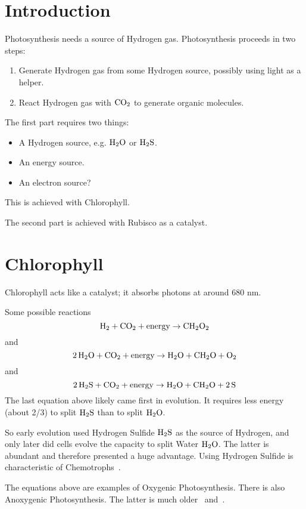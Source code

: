 \documentclass[a4paper,14pt]{extarticle}
\def\H{{\rm H}}
\def\O{{\rm O}}
\def\C{{\rm C}}
\def\S{{\rm S}}
\begin{document}

\section{Introduction}

Photosynthesis needs a source of Hydrogen gas.
Photosynthesis proceeds in two steps:
\begin{enumerate}
    \item Generate Hydrogen gas from some Hydrogen source, possibly using light as a helper.
    \item React Hydrogen gas with $\C\O_2$ to generate organic molecules.
\end{enumerate}
The first part requires two things:
\begin{itemize}
    \item A Hydrogen source, e.g. $\H_2\O$ or $\H_2\S$.
    \item An energy source.
    \item An electron source?
\end{itemize}
This is achieved with Chlorophyll.

The second part is achieved with Rubisco as a catalyst.

\section{Chlorophyll}

Chlorophyll acts like a catalyst; it absorbs photons at around 680 nm.

Some possible reactions
\[
    \H_2 + \C\O_2 + \text{energy} \rightarrow \C\H_2\O_2
\]
and
\[
    2\,\H_2\O + \C\O_2 + \text{energy} \rightarrow \H_2\O + \C\H_2\O + \O_2
\]
and
\[
    2\,\H_2\S + \C\O_2 + \text{energy} \rightarrow \H_2\O + \C\H_2\O + 2\,\S
\]
The last equation above likely came first in evolution. It requires less energy (about 2/3) to split $\H_2\S$
than to split $\H_2\O$.

So early evolution used Hydrogen Sulfide $\H_2\S$ as the source of Hydrogen, and only later did cells evolve the
capacity to split Water $\H_2\O$. The latter is abundant and therefore presented a huge advantage. Using Hydrogen
Sulfide is characteristic of Chemotrophs\ \cite{lithoautotroph}.

The equations above are examples of Oxygenic Photosynthesis. There is also Anoxygenic Photosynthesis. The latter
is much older\ \cite{anoxygenicphotosynthesis} and\ \cite{purplesulfurbacteria}.
\end{document}

